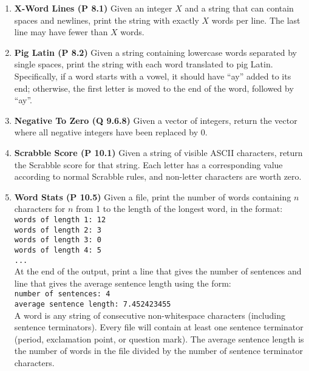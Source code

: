 \documentclass{sig-alternate}
\begin{document}
\begin{enumerate}
\item
\textbf{X-Word Lines (P 8.1)}
Given an integer $X$  and a string that can contain spaces and newlines, print the string with exactly $X$ words per line. The last line may have fewer than $X$ words.

\item
\textbf{Pig Latin (P 8.2)}
Given a string containing lowercase words separated by single spaces, print the string with each word translated to pig Latin. Specifically, if a word starts with a vowel, it should have ``ay'' added to its end; otherwise, the first letter is moved to the end of the word, followed by ``ay''.

\item
\textbf{Negative To Zero (Q 9.6.8)}
Given a vector of integers, return the vector where all negative integers have been replaced by 0.

\item
\textbf{Scrabble Score (P 10.1)}
Given a string of visible ASCII characters, return the Scrabble score for that string. Each letter has a corresponding value according to normal Scrabble rules, and non-letter characters are worth zero.

\item
\textbf{Word Stats (P 10.5)}
Given a file, print the number of words containing $n$ characters for $n$ from 1 to the length of the longest word, in the format:
\texttt{ \\
\hspace*{1cm}words of length 1: 12 \\
\hspace*{1cm}words of length 2: 3 \\
\hspace*{1cm}words of length 3: 0 \\
\hspace*{1cm}words of length 4: 5 \\
\hspace*{1cm}... \\
}
\noindent At the end of the output, print a line that gives the number of sentences and line that gives the average sentence length using the form:
\texttt{ \\
\hspace*{1cm}number of sentences: 4 \\
\hspace*{1cm}average sentence length: 7.452423455 \\
}
\noindent A word is any string of consecutive non-whitespace characters (including sentence terminators). Every file will contain at least one sentence terminator (period, exclamation point, or question mark). The average sentence length is the number of words in the file divided by the number of sentence terminator characters.

\end{enumerate}
\end{document}
